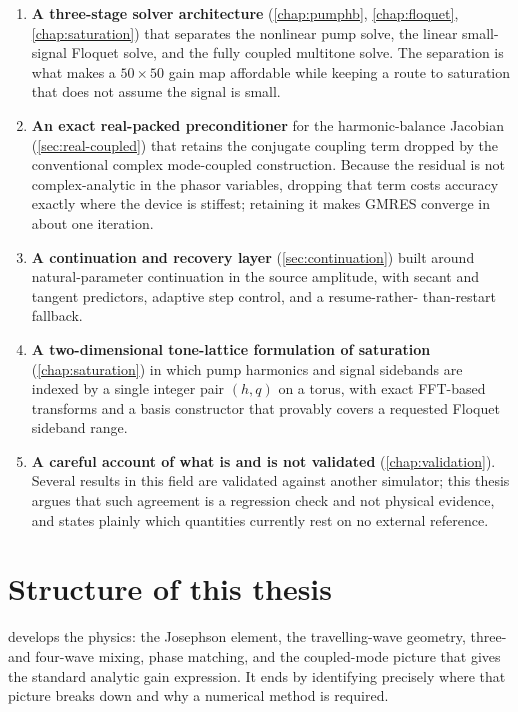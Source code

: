 \begin{enumerate}
\item \textbf{A three-stage solver architecture} (\cref{chap:pumphb},
      \cref{chap:floquet}, \cref{chap:saturation}) that separates the nonlinear
      pump solve, the linear small-signal Floquet solve, and the fully coupled
      multitone solve. The separation is what makes a $50\times50$ gain map
      affordable while keeping a route to saturation that does not assume the
      signal is small.

\item \textbf{An exact real-packed preconditioner} for the harmonic-balance
      Jacobian (\cref{sec:real-coupled}) that retains the conjugate coupling
      term dropped by the conventional complex mode-coupled construction.
      Because the residual is not complex-analytic in the phasor variables,
      dropping that term costs accuracy exactly where the device is stiffest;
      retaining it makes GMRES converge in about one iteration.

\item \textbf{A continuation and recovery layer} (\cref{sec:continuation})
      built around natural-parameter continuation in the source amplitude, with
      secant and tangent predictors, adaptive step control, and a resume-rather-
      than-restart fallback.

\item \textbf{A two-dimensional tone-lattice formulation of saturation}
      (\cref{chap:saturation}) in which pump harmonics and signal sidebands are
      indexed by a single integer pair $(h,q)$ on a torus, with exact FFT-based
      transforms and a basis constructor that provably covers a requested
      Floquet sideband range.

\item \textbf{A careful account of what is and is not validated}
      (\cref{chap:validation}). Several results in this field are validated
      against another simulator; this thesis argues that such agreement is a
      regression check and not physical evidence, and states plainly which
      quantities currently rest on no external reference.
\end{enumerate}

\section{Structure of this thesis}

 develops the physics: the Josephson element, the
travelling-wave geometry, three- and four-wave mixing, phase matching, and the
coupled-mode picture that gives the standard analytic gain expression. It ends
by identifying precisely where that picture breaks down and why a numerical
method is required.

